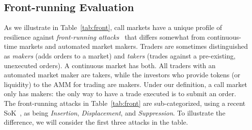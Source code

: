 \subsection{Front-running Evaluation} \label{sec:front}




As we illustrate in Table~\ref{tab:front}, call markets have a unique profile of resilience against \emph{front-running attacks}~\cite{clark2014decentralizing,eskandari2019sok,daian2019flash} that differs somewhat from continuous-time markets and automated market makers. Traders are sometimes distinguished as \emph{makers} (adds orders to a market) and \emph{takers} (trades against a pre-existing, unexecuted orders). A continuous market has both. All traders with an automated market maker are takers, while the investors who provide tokens (or liquidity) to the AMM for trading are makers. Under our definition, a call market only has makers: the only way to have a trade executed is to submit an order. The front-running attacks in Table~\ref{tab:front} are sub-categorized, using a recent SoK~\cite{eskandari2019sok}, as being \emph{Insertion}, \emph{Displacement}, and \emph{Suppression}. To illustrate the difference, we will consider the first three attacks in the table. 

